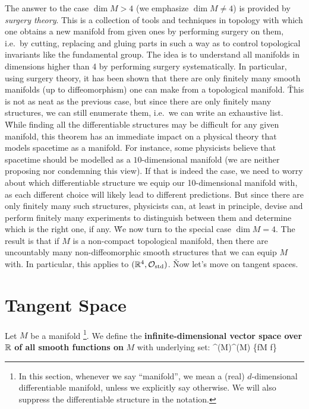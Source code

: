 The answer to the case $\dim M > 4$ (we emphasize $\dim M \neq 4$) is provided by \emph{surgery theory}. This is a
collection of tools and techniques in topology with which one obtains a new manifold from given ones by performing
surgery on them, i.e.\ by cutting, replacing and gluing parts in such a way as to control topological invariants like
the fundamental group. The idea is to understand all manifolds in dimensions higher than 4 by performing surgery
systematically. In particular, using surgery theory, it has been shown that there are only finitely many smooth
manifolds (up to diffeomorphism) one can make from a topological manifold. \v

This is not as neat as the previous case, but since there are only finitely many structures, we can still enumerate
them, i.e.\ we can write an exhaustive list. \v

While finding all the differentiable structures may be difficult for any given manifold, this theorem has an
immediate impact on a physical theory that models spacetime as a manifold. For instance, some physicists believe that
spacetime should be modelled as a $10$-dimensional manifold (we are neither proposing nor condemning this view). If
that is indeed the case, we need to worry about which differentiable structure we equip our 10-dimensional manifold
with, as each different choice will likely lead to different predictions. But since there are only finitely many such
structures, physicists can, at least in principle, devise and perform finitely many experiments to distinguish
between them and determine which is the right one, if any. \v

We now turn to the special case $\dim M = 4$. The result is that if $M$ is a non-compact topological manifold, then
there are uncountably many non-diffeomorphic smooth structures that we can equip $M$ with. In particular, this
applies to $(\mathbb{R}^4,\mathcal{O}_\mathrm{std})$. \v

Now let's move on tangent spaces.

\section{Tangent Space}

Let $M$ be a manifold \footnote{In this section, whenever we say ``manifold'', we mean a (real) $d$-dimensional
differentiable manifold, unless we explicitly say otherwise. We will also suppress the differentiable structure in
the notation. }. We define the \textbf{infinite-dimensional vector space over} $\mathbb{R}$ \textbf{of all smooth functions
on} $M$ with underlying set:
\bse
{}^\infty(M)^\infty(M) \coloneqq \{f\cl M \to \R \mid f\}
\ese

